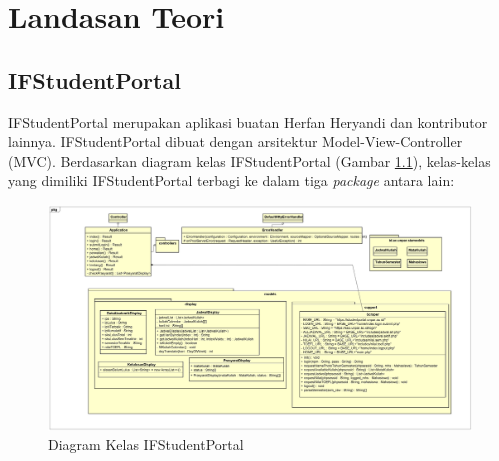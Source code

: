 \chapter{Landasan Teori}
\label{chap:teori}

\section{IFStudentPortal}
\label{sec:ifstudentportal} 
 
IFStudentPortal \cite{ifstudentportal} merupakan aplikasi buatan Herfan Heryandi dan kontributor lainnya. IFStudentPortal dibuat dengan arsitektur Model-View-Controller (MVC). Berdasarkan diagram kelas IFStudentPortal (Gambar \ref{fig:2_ifstudentportal_class}), kelas-kelas yang dimiliki IFStudentPortal terbagi ke dalam tiga \textit{package} antara lain:

\begin{figure}[H]
\centering
\includegraphics[scale=0.135]{Gambar/class-diagram-ifstudentportal}
\caption{Diagram Kelas IFStudentPortal}
\label{fig:2_ifstudentportal_class}
\end{figure}

